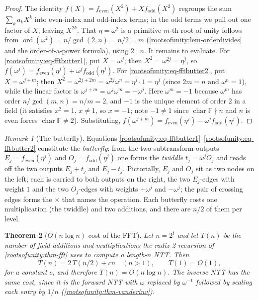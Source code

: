 \documentclass[11pt,a4paper]{article}
\newtheorem{theorem}{Theorem}[section]
\theoremstyle{definition}
\theoremstyle{remark}
\newtheorem{remark}[theorem]{Remark}
\newcommand{\F}{\ensuremath{\mathbb{F}}}
\DeclareMathOperator{\ord}{ord}
\begin{document}
\begin{proof}
The identity \(f(X) = f_{\mathrm{even}}(X^2) + X f_{\mathrm{odd}}(X^2)\) regroups the sum \(\sum_k a_k X^k\) into even-index and odd-index terms; in the odd terms we pull out one factor of \(X\), leaving \(X^{2k}\). That \(\eta = \omega^2\) is a primitive \(m\)-th root of unity follows from \(\ord(\omega^2) = n/\gcd(2,n) = n/2 = m\) (\cref{rootsofunity:lem-orderdivides} and the order-of-a-power formula), using \(2 \mid n\). It remains to evaluate. For \eqref{rootsofunity:eq-fftbutter1}, put \(X = \omega^j\); then \(X^2 = \omega^{2j} = \eta^{j}\), so \(f(\omega^j) = f_{\mathrm{even}}(\eta^j) + \omega^j f_{\mathrm{odd}}(\eta^j)\). For \eqref{rootsofunity:eq-fftbutter2}, put \(X = \omega^{j+m}\); then \(X^2 = \omega^{2j+2m} = \omega^{2j}\omega^{n} = \eta^{j}\cdot 1 = \eta^j\) (since \(2m = n\) and \(\omega^n=1\)), while the linear factor is \(\omega^{j+m} = \omega^j \omega^m = -\omega^j\). Here \(\omega^m = -1\) because \(\omega^m\) has order \(n/\gcd(m,n) = n/m = 2\), and \(-1\) is the unique element of order \(2\) in a field (it satisfies \(x^2=1\), \(x\ne 1\), so \(x=-1\); note \(-1 \ne 1\) since \(\operatorname{char}\F \nmid n\) and \(n\) is even forces \(\operatorname{char}\F \ne 2\)). Substituting, \(f(\omega^{j+m}) = f_{\mathrm{even}}(\eta^j) - \omega^j f_{\mathrm{odd}}(\eta^j)\).
\end{proof}

\begin{remark}[The butterfly]\label{rootsofunity:rem-butterfly}
Equations \eqref{rootsofunity:eq-fftbutter1}--\eqref{rootsofunity:eq-fftbutter2} constitute the \emph{butterfly}: from the two subtransform outputs \(E_j = f_{\mathrm{even}}(\eta^j)\) and \(O_j = f_{\mathrm{odd}}(\eta^j)\) one forms the \emph{twiddle} \(t_j = \omega^j O_j\) and reads off the two outputs \(E_j + t_j\) and \(E_j - t_j\). Pictorially, \(E_j\) and \(O_j\) sit as two nodes on the left; each is carried to both outputs on the right, the two \(E_j\)-edges with weight \(1\) and the two \(O_j\)-edges with weights \(+\omega^j\) and \(-\omega^j\); the pair of crossing edges forms the \(\times\) that names the operation. Each butterfly costs one multiplication (the twiddle) and two additions, and there are \(n/2\) of them per level.
\end{remark}

\begin{theorem}[\(O(n\log n)\) cost of the FFT]\label{rootsofunity:thm-fftcost}
Let \(n = 2^t\) and let \(T(n)\) be the number of field additions and multiplications the radix-2 recursion of \cref{rootsofunity:thm-fft} uses to compute a length-\(n\) NTT. Then
\[
  T(n) = 2\,T(n/2) + cn \quad (n>1), \qquad T(1) = O(1),
\]
for a constant \(c\), and therefore \(T(n) = O(n\log n)\). The inverse NTT has the same cost, since it is the forward NTT with \(\omega\) replaced by \(\omega^{-1}\) followed by scaling each entry by \(1/n\) (\cref{rootsofunity:thm-vanderinv}).
\end{theorem}
\end{document}
